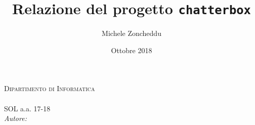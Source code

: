 \documentclass{article}
\title{Relazione del progetto \texttt{chatterbox}}
\author{Michele Zoncheddu}
\date{Ottobre 2018}
\begin{document}
\begin{titlepage}
	\centering
	\textsc{\LARGE Dipartimento di Informatica}\\[3.5 cm]
	{\huge{\@title}}\\[0.5 cm]
	{\LARGE{SOL a.a. 17-18}}\\[5.5 cm]
	\emph{Autore:}\\

	\@date
\end{titlepage}

\tableofcontents
{}
\pagebreak

\sloppy

	
	
\end{document}
